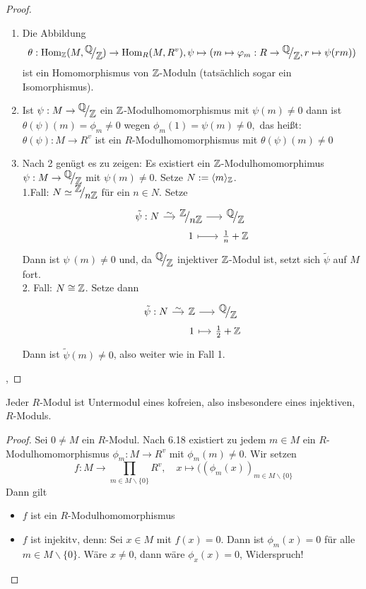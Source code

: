 \begin{proof}
	\begin{enumerate}
		\item Die Abbildung $$\theta: \Hom_{\Z}(M ,\QR{\Q}{\Z}) \to \Hom_{R}(M, R^{v}), \psi \mapsto (m \mapsto \phi_m: R \to \QR{\Q}{\Z}, r \mapsto \psi(rm))$$
		ist ein Homomorphismus von $\mathbb{Z}$-Moduln (tatsächlich sogar ein Isomorphismus).
		\item Ist $\psi: M \to \QR{\Q}{\Z} $ ein $\mathbb{Z}$-Modulhomomorphismus mit $ \psi(m) \neq 0$ dann ist $\theta(\psi)(m) = \phi_m \neq 0$ wegen $\phi_m(1)= \psi(m) \neq 0, $ das heißt: $\theta(\psi): M \to R^{v} $ ist ein $R$-Modulhomomorphismus mit $\theta(\psi)(m) \neq 0$
		\item Nach 2 genügt es zu zeigen: Es existiert ein $\mathbb{Z}$-Modulhomomorphimus $\psi: M \to \QR{\Q}{\Z} $ mit $ \psi(m) \neq 0. $ Setze $N := \langle m\rangle_{\mathbb{Z}}$. \\
		1.Fall: $N \simeq \QR{\Z}{n\Z} $ für ein $n \in N $. Setze
		$$\begin{tikzcd}[column sep = small, row sep = 0.1 ex]
		\tilde{\psi}: N \arrow{r}{\sim} & \QR{\Z}{n \Z} \arrow{r} & \QR{\Q}{\Z} \\
		& 1 \arrow[mapsto]{r} & \frac{1}{n} + \Z
		\end{tikzcd}$$
		 Dann ist $\psi^{~}(m)\neq 0 $ und, da $\QR{\Q}{\Z} $ injektiver $\mathbb{Z}$-Modul ist, setzt sich $\tilde{\psi} $ auf $M$ fort.\\
		2. Fall: $N \cong \mathbb{Z}$. Setze dann 
		$$\begin{tikzcd}[column sep = small, row sep = 0.1 ex]
		\tilde{\psi}: N \arrow{r}{\sim} & \Z \arrow{r} & \QR{\Q}{\Z} \\
		& 1 \arrow[mapsto]{r} & \frac{1}{2} + \Z
		\end{tikzcd}$$
		Dann ist $\tilde{\psi} (m) \neq 0$, also weiter wie in Fall 1.
	\end{enumerate}, 
\end{proof}
\begin{sa}\label{6.19}
	Jeder $R$-Modul ist Untermodul eines kofreien, also insbesondere eines injektiven, $R$-Moduls.
\end{sa}
\begin{proof}
	Sei $0\neq M$ ein $R$-Modul. Nach 6.18 existiert zu jedem $m\in M$ ein $R$-Modulhomomorphismus $\phi_m:M \to R^v$ mit $\phi_m(m) \neq 0$. Wir setzen
	$$f:M \longrightarrow \prod_{m\in M\backslash \{0\}} R^v, \quad x \mapsto ((\phi_m(x))_{m\in M \backslash \{0\}}$$
	Dann gilt
	\begin{itemize}
		\item $f$ ist ein $R$-Modulhomomorphismus
		\item $f$ ist injekitv, denn: Sei $x\in M$ mit $f(x) = 0$. Dann ist $\phi_m(x) = 0$ für alle $m\in M\backslash \{0\}$. Wäre $x\neq 0$, dann wäre $\phi_x(x) = 0$, Widerspruch!
	\end{itemize}
\end{proof}
